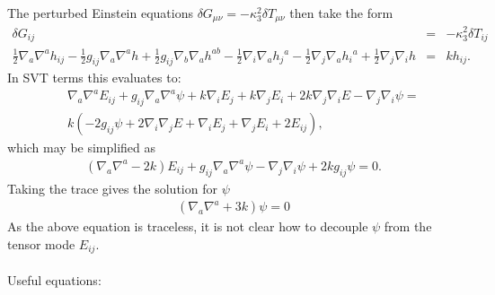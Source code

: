 \documentclass[10pt,letterpaper]{article}
\numberwithin{equation}{section}
\begin{document}
The perturbed Einstein equations  $\delta G_{\mu\nu} =-\kappa_3^2 \delta T_{\mu\nu}$ then take the form
\begin{eqnarray}
\delta G_{ij} &=& -\kappa^2_3 \delta T_{ij}\\
\tfrac{1}{2} \nabla_{a}\nabla^{a}h_{ij}
 -  \tfrac{1}{2} g_{ij} \nabla_{a}\nabla^{a}h
 + \tfrac{1}{2} g_{ij} \nabla_{b}\nabla_{a}h^{ab}
 -  \tfrac{1}{2} \nabla_{i}\nabla_{a}h_{j}{}^{a}
 -  \tfrac{1}{2} \nabla_{j}\nabla_{a}h_{i}{}^{a}
 + \tfrac{1}{2} \nabla_{j}\nabla_{i}h&=& k h_{ij}.
\end{eqnarray}
In SVT terms this evaluates to:
\begin{eqnarray}
&&\nabla_{a}\nabla^{a}E_{ij}
 +g_{ij} \nabla_{a}\nabla^{a}\psi
 + k \nabla_{i}E_{j}
 + k \nabla_{j}E_{i}
 + 2 k \nabla_{j}\nabla_{i}E
 -  \nabla_{j}\nabla_{i}\psi =
\nonumber \\
&& k (-2 g_{ij}\psi + 2\nabla_i\nabla_j E + \nabla_i E_j + \nabla_j E_i + 2E_{ij}),
\end{eqnarray}
which may be simplified as
\begin{eqnarray}\boxed{
(\nabla_a \nabla^a-2k)E_{ij} + g_{ij}\nabla_a \nabla^a \psi - \nabla_j\nabla_i \psi+2k g_{ij}\psi = 0.
\label{dgdt}}
\end{eqnarray}
Taking the trace gives the solution for $\psi$
\begin{eqnarray}\boxed{
(\nabla_a \nabla^a + 3k)\psi = 0
\label{dgdttr}}
\end{eqnarray}
As the above equation is traceless, it is not clear how to decouple $\psi$ from the tensor mode $E_{ij}$. 
\\ \\
Useful equations:
\end{document}
